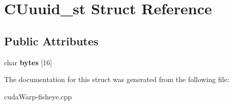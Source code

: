 \hypertarget{structCUuuid__st}{}\section{C\+Uuuid\+\_\+st Struct Reference}
\label{structCUuuid__st}
\subsection*{Public Attributes}
\begin{DoxyCompactItemize}
\item 
char {\bfseries bytes} \mbox{[}16\mbox{]}\hypertarget{structCUuuid__st_a17c937725181481e92f6c8ff2bf9c23a}{}\label{structCUuuid__st_a17c937725181481e92f6c8ff2bf9c23a}

\end{DoxyCompactItemize}


The documentation for this struct was generated from the following file\+:\begin{DoxyCompactItemize}
\item 
cuda\+Warp-\/fisheye.\+cpp\end{DoxyCompactItemize}
